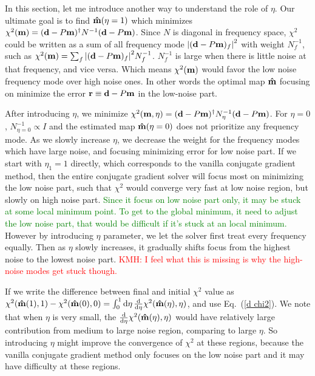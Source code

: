 \documentclass[twocolumn,linenumbers]{aastex631}
\newcommand{\vbd}{\vb{d}}
\newcommand{\vbm}{\vb{m}}
\newcommand{\inv}[1]{#1^{-1}}
\newcommand{\hatm}{\vb{\hat{m}}}
\newcommand{\Nbar}{\bar{N}}
\newcommand{\Neta}{N_{\eta}}
\newcommand{\kmh}[1]{\textcolor{red}{KMH: #1}}
\begin{document}
In this section, let me introduce another way to understand the role of $\eta$.
Our ultimate goal is to find $\hatm(\eta=1)$ which minimizes 
$\chi^2(\vbm) = (\vbd - P\vbm)^{\dagger} \inv{N} (\vbd - P\vbm)$.
Since $N$ is diagonal in frequency space,
$\chi^2$ could be written as a sum of all frequency mode 
$\qty|(\vbd-P\vbm)_f|^2$ with weight $\inv{N}_f$, such as
$\chi^2(\vbm) = \sum_f \qty|(\vbd-P\vbm)_f|^2 \inv{N}_f$.
$\inv{N}_f$ is large when there is little noise at that frequency,
and vice versa.
Which means $\chi^2(\vbm)$ would favor the low noise frequency mode over high 
noise ones.
In other words the optimal map $\hatm$ focusing on minimize the error
$\vb{r} \equiv \vbd - P\vbm$ in the low-noise part.

After introducing $\eta$, we minimize
$\chi^2(\vbm,\eta)=(\vbd-P\vbm)^{\dagger} N_{\eta}^{-1} (\vbd - P\vbm)$.
For $\eta=0$, $N^{-1}_{\eta=0} \propto I$ and the estimated map $\hatm(\eta=0)$
does not prioritize any frequency mode.
As we slowly increase $\eta$, we decrease the weight for the frequency modes
which have large noise, and focusing minimizing error for low noise part.
If we start with $\eta_1=1$ directly, which corresponds to the vanilla conjugate
gradient method, then the entire conjugate gradient solver
will focus most on minimizing the low noise part, such that $\chi^2$ would
converge very fast at low noise region, but slowly on high noise part.
\textcolor{green}{
Since it focus on low noise part only, it may be stuck at some local minimum point.
To get to the global minimum, it need to adjust the low noise part, that would
be difficult if it's stuck at an local minimum.
}
However by introducing $\eta$ parameter, we let the solver first treat every
frequency equally.
Then as $\eta$ slowly increases, it gradually shifts focus from the highest noise to the lowest noise
part.  \kmh{I feel what this is missing is why the high-noise modes get stuck though.}


If we write the difference between final and initial $\chi^2$ value as
$\chi^2(\hatm(1),1) - \chi^2(\hatm(0),0) = \int_0^1 \dd{\eta}
\dv{\eta} \chi^2(\hatm(\eta),\eta)$,
and use Eq.~(\ref{d chi2}).
We note that when $\eta$ is very small, 
the $\dv{\eta}\chi^2(\hatm(\eta),\eta)$ would have relatively large
contribution from medium to large noise region, comparing to large $\eta$.
So introducing $\eta$ might improve the convergence of $\chi^2$ at these
regions, because the vanilla conjugate gradient method only focuses on the low noise
part and it may have difficulty at these regions.
\end{document}
